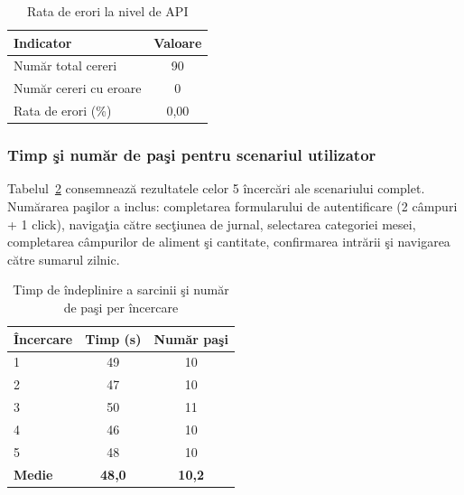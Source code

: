 \documentclass[12pt,a4paper]{article}
\begin{document}
\begin{table}[h!]
  \centering
  \caption{Rata de erori la nivel de API}
  \label{tab:rata-erori}
  \vspace{4pt}
  \begin{tabular}{@{}lc@{}}
    \toprule
    \textbf{Indicator}             & \textbf{Valoare} \\
    \midrule
    Num\u{a}r total cereri      & 90      \\
    Num\u{a}r cereri cu eroare  & 0       \\
    Rata de erori (\%)          & 0{,}00  \\
    \bottomrule
  \end{tabular}
\end{table}

\vspace{6pt}

\subsubsection*{Timp \c{s}i num\u{a}r de pa\c{s}i pentru scenariul utilizator}

Tabelul~\ref{tab:timp-task} consemneaz\u{a} rezultatele celor 5 \^{i}ncerc\u{a}ri ale scenariului complet. Num\u{a}rarea pa\c{s}ilor a inclus: completarea formularului de autentificare (2 c\^{a}mpuri + 1 click), naviga\c{t}ia c\u{a}tre sec\c{t}iunea de jurnal, selectarea categoriei mesei, completarea c\^{a}mpurilor de aliment \c{s}i cantitate, confirmarea intr\u{a}rii \c{s}i navigarea c\u{a}tre sumarul zilnic.

\begin{table}[h!]
  \centering
  \caption{Timp de \^{i}ndeplinire a sarcinii \c{s}i num\u{a}r de pa\c{s}i per \^{i}ncercare}
  \label{tab:timp-task}
  \vspace{4pt}
  \begin{tabular}{@{}lcc@{}}
    \toprule
    \textbf{\^{I}ncercare} & \textbf{Timp (s)} & \textbf{Num\u{a}r pa\c{s}i} \\
    \midrule
    1 & 49 & 10 \\
    2 & 47 & 10 \\
    3 & 50 & 11 \\
    4 & 46 & 10 \\
    5 & 48 & 10 \\
    \midrule
    \textbf{Medie} & \textbf{48{,}0} & \textbf{10{,}2} \\
    \bottomrule
  \end{tabular}
\end{table}
\end{document}
